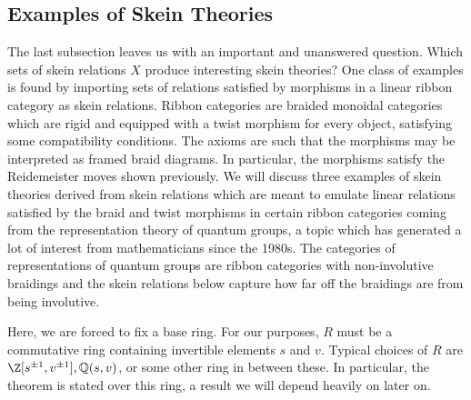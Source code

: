 \subsection{Examples of Skein Theories}

The last subsection leaves us with an important and unanswered question. Which sets of skein relations $X$ produce interesting skein theories? One class of examples is found by importing sets of relations satisfied by morphisms in a linear ribbon category as skein relations. Ribbon categories are braided monoidal categories which are rigid and equipped with a twist morphism for every object, satisfying some compatibility conditions. The axioms are such that the morphisms may be interpreted as framed braid diagrams. In particular, the morphisms satisfy the Reidemeister moves shown previously. We will discuss three examples of skein theories derived from skein relations which are meant to emulate linear relations satisfied by the braid and twist morphisms in certain ribbon categories coming from the representation theory of quantum groups, a topic which has generated a lot of interest from mathematicians since the 1980s. The categories of representations of quantum groups are ribbon categories with non-involutive braidings and the skein relations below capture how far off the braidings are from being involutive.  

Here, we are forced to fix a base ring. For our purposes, $R$ must be a commutative ring containing invertible elements $s$ and $v$. Typical choices of $R$ are $\Z[s^{\pm 1}, v^{\pm 1}], \Q(s, v)$, or some other ring in between these.  In particular, the theorem  is stated over this ring, a result we will depend heavily on later on. \\

